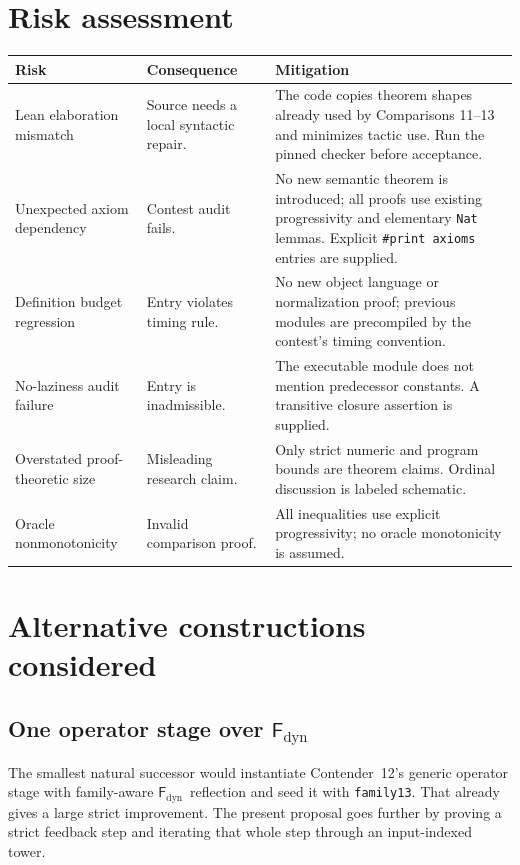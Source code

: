 \documentclass[11pt]{article}
\theoremstyle{definition}
\newcommand{\Fd}{\ensuremath{\mathsf{F}_{\mathrm{dyn}}}}
\newcommand{\lean}[1]{\texttt{#1}}
\begin{document}
\section{Risk assessment}

\begin{longtable}{>{\raggedright\arraybackslash}p{}
                  >{\raggedright\arraybackslash}p{}
                  >{\raggedright\arraybackslash}p{}}
\toprule
Risk & Consequence & Mitigation \\
\midrule
\endhead
Lean elaboration mismatch & Source needs a local syntactic repair. & The code
copies theorem shapes already used by Comparisons 11--13 and minimizes tactic
use.  Run the pinned checker before acceptance. \\
Unexpected axiom dependency & Contest audit fails. & No new semantic theorem is
introduced; all proofs use existing progressivity and elementary \lean{Nat}
lemmas.  Explicit \lean{\#print axioms} entries are supplied. \\
Definition budget regression & Entry violates timing rule. & No new object
language or normalization proof; previous modules are precompiled by the
contest's timing convention. \\
No-laziness audit failure & Entry is inadmissible. & The executable module does
not mention predecessor constants.  A transitive closure assertion is supplied. \\
Overstated proof-theoretic size & Misleading research claim. & Only strict
numeric and program bounds are theorem claims.  Ordinal discussion is labeled
schematic. \\
Oracle nonmonotonicity & Invalid comparison proof. & All inequalities use
explicit progressivity; no oracle monotonicity is assumed. \\
\bottomrule
\end{longtable}

\section{Alternative constructions considered}

\subsection{\texorpdfstring{One operator stage over \Fd}{One operator stage over Fd}}
The smallest natural successor would instantiate Contender~12's generic
operator stage with family-aware \Fd\ reflection and seed it with
\lean{family13}.  That already gives a large strict improvement.  The present
proposal goes further by proving a strict feedback step and iterating that
whole step through an input-indexed tower.
\end{document}
